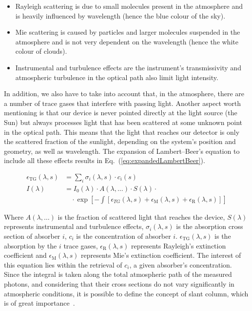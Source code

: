 \begin{itemize}
      \item Rayleigh scattering is due to small molecules present in the
          atmosphere and is heavily influenced by wavelength (hence the
          blue colour of the
      sky).
      \item Mie scattering is caused by particles and larger molecules
          suspended in the atmosphere and is not very dependent
      on the wavelength (hence the white colour of clouds).
      \item Instrumental and turbulence effects are the instrument's
          transmissivity and atmospheric turbulence in the optical path
          also limit light intensity.
  \end{itemize}

In addition, we also have to take into account that, in the atmosphere,
there are a number of trace gases that interfere with passing light.
Another aspect worth mentioning is that our device is never pointed
directly at the light source (the Sun) but always processes light that
has been scattered at some unknown point in the optical path. This means
that the light that reaches our detector is only the scattered fraction
of the sunlight, depending on the system's position and geometry, as
well as wavelength. The expansion of Lambert--Beer's equation to include
all these effects results in Eq.~(\ref{eq:expandedLambertBeer}).

\begin{equation}
    \label{eq:expandedLambertBeer}
    \begin{aligned}
        \epsilon_\mathrm{TG}(\lambda, s)&=\sum_{i} \sigma_{i}(\lambda, s)
            \cdot c_{i}(s)\\
       I(\lambda) &= I_0(\lambda) \cdot A(\lambda, \ldots) \cdot
            S(\lambda) \cdot\\
                   &\quad\cdot \exp \left[ -\int \left[
                       \epsilon_{TG}(\lambda, s) +
                           \epsilon_{\mathrm{M}}(\lambda, s) +
                               \epsilon_{\mathrm{R}}(\lambda, s)  \right] \right] 
    \end{aligned}
\end{equation}

Where $A(\lambda, \ldots)$ is the fraction of scattered light that
reaches the device, $S(\lambda)$ represents instrumental and turbulence
effects, $\sigma_{i}(\lambda, s)$ is the absorption cross section of
absorber $i$, $c_{i}$ is the concentration of absorber $i$.
$\epsilon_{\mathrm{TG}}(\lambda, s)$ is the absorption by the $i$ trace
gases, $\epsilon_\mathrm{R}(\lambda, s)$ represents Rayleigh's
extinction coefficient and $\epsilon_\mathrm{M}(\lambda, s)$ represents
Mie's extinction coefficient. The interest of this equation lies within
the retrieval of $c_i$, a given absorber's concentration. Since the
integral is taken along the total atmospheric path of the measured
photons, and considering that their cross sections do not vary
significantly in atmospheric conditions, it is possible to define the
concept of slant column, which is of great
importance~\cite{Merlaud2013}.

